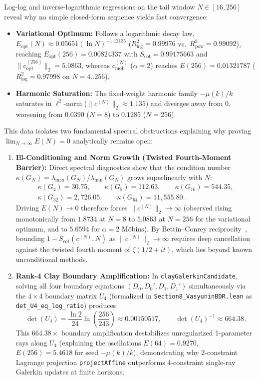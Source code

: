 \documentclass[11pt,a4paper]{article}
\theoremstyle{definition}
\begin{document}
Log-log and inverse-logarithmic regressions on the tail window $N \in [16, 256]$ reveal why no simple closed-form sequence yields fast convergence:
\begin{itemize}[noitemsep]
  \item \textbf{Variational Optimum:} Follows a logarithmic decay law, $E_{\mathrm{opt}}(N) \approx 0.05651 (\ln N)^{-1.12135}$ ($R^2_{\log} = 0.99976$ vs.\ $R^2_{\text{pow}} = 0.99092$), reaching $E_{\mathrm{opt}}(256) = 0.00824337$ with $S_{\mathrm{cot}} = 0.99175663$ and $\|c_{\mathrm{opt}}^{(256)}\|_2 = 5.0863$, whereas $c^{(N)}_{\mathrm{mob}}$ ($\alpha = 2$) reaches $E(256) = 0.01321787$ ($R^2_{\log} = 0.97998$ on $N = 4..256$).
  \item \textbf{Harmonic Saturation:} The fixed-weight harmonic family $-\mu(k)/k$ saturates in $\ell^2$-norm ($\|c^{(N)}\|_2 \approx 1.135$) and diverges away from $0$, worsening from $0.0390$ ($N=8$) to $0.1285$ ($N=256$).
\end{itemize}

This data isolates two fundamental spectral obstructions explaining why proving $\lim_{N\to\infty} E(N) = 0$ analytically remains open:
\begin{enumerate}[noitemsep]
  \item \textbf{Ill-Conditioning and Norm Growth (Twisted Fourth-Moment Barrier):} Direct spectral diagnostics show that the condition number $\kappa(G_N) = \lambda_{\max}(G_N)/\lambda_{\min}(G_N)$ grows superlinearly with $N$:
  \begin{gather}
  \kappa(G_4) = 30.75, \qquad \kappa(G_8) = 112.63, \qquad \kappa(G_{16}) = 544.35, \nonumber \\
  \kappa(G_{32}) = 2{,}726.05, \qquad \kappa(G_{64}) = 11{,}555.80.
  \end{gather}
  Driving $E(N) \to 0$ therefore forces $\|c^{(N)}\|_2 \to \infty$ (observed rising monotonically from $1.8734$ at $N=8$ to $5.0863$ at $N=256$ for the variational optimum, and to $5.6594$ for $\alpha = 2$ M\"obius). By Bettin--Conrey reciprocity~\cite{BettinConrey2013}, bounding $1 - S_{\mathrm{cot}}(c^{(N)}, N)$ as $\|c^{(N)}\|_2 \to \infty$ requires deep cancellation against the twisted fourth moment of $\zeta(1/2+it)$, which lies beyond known unconditional methods.
  \item \textbf{Rank-4 Clay Boundary Amplification:} In \texttt{clayGalerkinCandidate}, solving all four boundary equations $(D_0, D_0', D_1, D_1')$ simultaneously via the $4 \times 4$ boundary matrix $U_4$ (formalized in \texttt{Section8\_\allowbreak VasyuninBDR.lean} as \texttt{det\_U4\_eq\_log\_ratio}) produces
  \begin{equation}
  \det(U_4) = \frac{\ln 2}{24} \ln\!\left(\frac{256}{243}\right) \approx 0.00150517, \qquad \det(U_4)^{-1} \approx 664.38.
  \end{equation}
  This $664.38\times$ boundary amplification destabilizes unregularized 1-parameter rays along $U_4$ (explaining the oscillations $E(64) = 0.9270$, $E(256) = 5.4618$ for seed $-\mu(k)/k$), demonstrating why 2-constraint Lagrange projection \texttt{projectAffine} outperforms 4-constraint single-ray Galerkin updates at finite horizons.
\end{enumerate}
\end{document}
